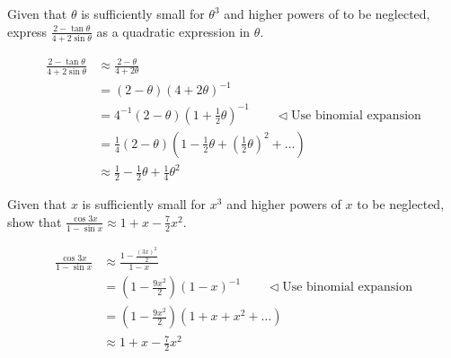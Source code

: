 \documentclass[11pt,a4paper]{book}
\begin{document}
\begin{example}

Given that $\theta$ is sufficiently small for $\theta^{3}$ and higher
powers of to be neglected, express ${\displaystyle \frac{2-\tan\theta}{4+2\sin\theta}}$
as a quadratic expression in $\theta$.

\Solution

\begin{align*}
\frac{2-\tan\theta}{4+2\sin\theta} & \approx\frac{2-\theta}{4+2\theta}\\
 & =\left(2-\theta\right)\left(4+2\theta\right)^{-1}\\
 & =4^{-1}\left(2-\theta\right)\left(1+\frac{1}{2}\theta\right)^{-1}\qquad\triangleleft\text{Use binomial expansion}\\
 & =\frac{1}{4}\left(2-\theta\right)\left(1-\frac{1}{2}\theta+\left(\frac{1}{2}\theta\right)^{2}+\ldots\right)\\
 & \approx\frac{1}{2}-\frac{1}{2}\theta+\frac{1}{4}\theta^{2}
\end{align*}

\end{example}



\begin{example}

Given that $x$ is sufficiently small for $x^{3}$ and higher powers
of $x$ to be neglected, show that ${\displaystyle \frac{\cos3x}{1-\sin x}\approx1+x-\frac{7}{2}x^{2}}$.

\medskip

\Solution

\begin{align*}
\frac{\cos3x}{1-\sin x} & \approx\frac{1-\frac{\left(3x\right)^{2}}{2}}{1-x}\\
 & =\left(1-\frac{9x^{2}}{2}\right)\left(1-x\right)^{-1}\qquad\triangleleft\text{Use binomial expansion}\\
 & =\left(1-\frac{9x^{2}}{2}\right)\left(1+x+x^{2}+\ldots\right)\\
 & \approx1+x-\frac{7}{2}x^{2}
\end{align*}

\end{example}
\end{document}
